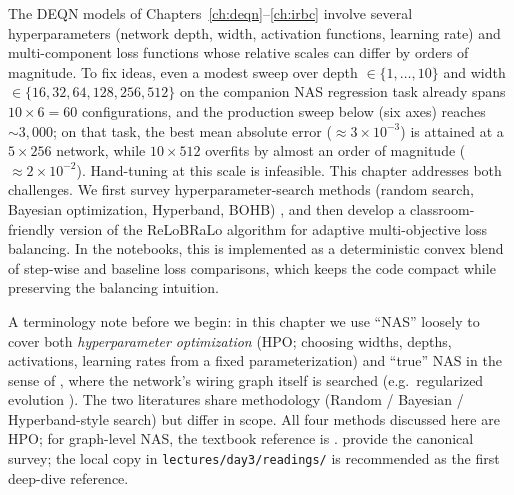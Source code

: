 \documentclass[11pt,a4paper]{report}
\begin{document}
The DEQN models of Chapters~\ref{ch:deqn}--\ref{ch:irbc} involve several hyperparameters (network depth, width, activation functions, learning rate) and multi-component loss functions whose relative scales can differ by orders of magnitude.  To fix ideas, even a modest sweep over depth $\in\{1,\ldots,10\}$ and width $\in\{16, 32, 64, 128, 256, 512\}$ on the companion NAS regression task already spans $10\times 6 = 60$ configurations, and the production sweep below (six axes) reaches $\sim 3{,}000$; on that task, the best mean absolute error ($\approx 3\times 10^{-3}$) is attained at a $5\times 256$ network, while $10\times 512$ overfits by almost an order of magnitude ($\approx 2\times 10^{-2}$).  Hand-tuning at this scale is infeasible.  This chapter addresses both challenges.  We first survey hyperparameter-search methods (random search, Bayesian optimization, Hyperband, BOHB) \citep{bergstra2012random, snoek2012practical, jamieson2016nonstochastic, li2018hyperband, falkner2018bohb, garnett2023bayesian}, and then develop a classroom-friendly version of the ReLoBRaLo algorithm \citep{bischof2025relobralo} for adaptive multi-objective loss balancing.  In the notebooks, this is implemented as a deterministic convex blend of step-wise and baseline loss comparisons, which keeps the code compact while preserving the balancing intuition.

A terminology note before we begin: in this chapter we use ``NAS'' loosely to cover both \emph{hyperparameter optimization} (HPO; choosing widths, depths, activations, learning rates from a fixed parameterization) and ``true'' NAS in the sense of \citet{elsken2019neural}, where the network's wiring graph itself is searched (e.g.\ regularized evolution \citep{real2019regularized}).  The two literatures share methodology (Random / Bayesian / Hyperband-style search) but differ in scope.  All four methods discussed here are HPO; for graph-level NAS, the textbook reference is \citet{hutter2019automl}.  \citet{elsken2019neural} provide the canonical survey; the local copy in \texttt{lectures/day3/readings/} is recommended as the first deep-dive reference.
\end{document}
